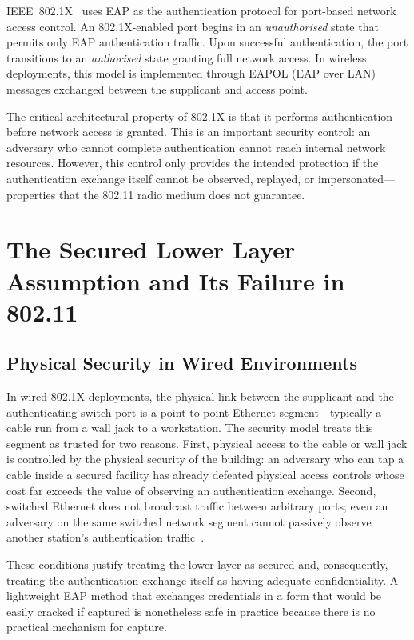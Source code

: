 \documentclass[journal]{IEEEtran}
\begin{document}
IEEE~802.1X~\cite{ieee8021x} uses EAP as the authentication protocol for port-based
network access control. An 802.1X-enabled port begins in an \emph{unauthorised} state
that permits only EAP authentication traffic. Upon successful authentication, the
port transitions to an \emph{authorised} state granting full network access. In
wireless deployments, this model is implemented through EAPOL (EAP over LAN) messages
exchanged between the supplicant and access point.

The critical architectural property of 802.1X is that it performs authentication
before network access is granted. This is an important security control: an adversary
who cannot complete authentication cannot reach internal network resources. However,
this control only provides the intended protection if the authentication exchange
itself cannot be observed, replayed, or impersonated---properties that the 802.11
radio medium does not guarantee.

\section{The Secured Lower Layer Assumption and Its Failure in 802.11}

\subsection{Physical Security in Wired Environments}

In wired 802.1X deployments, the physical link between the supplicant and the
authenticating switch port is a point-to-point Ethernet segment---typically a
cable run from a wall jack to a workstation. The security model treats this segment
as trusted for two reasons. First, physical access to the cable or wall jack is
controlled by the physical security of the building: an adversary who can tap a
cable inside a secured facility has already defeated physical access controls whose
cost far exceeds the value of observing an authentication exchange. Second, switched
Ethernet does not broadcast traffic between arbitrary ports; even an adversary on
the same switched network segment cannot passively observe another station's
authentication traffic~\cite{edney2004}.

These conditions justify treating the lower layer as secured and, consequently,
treating the authentication exchange itself as having adequate confidentiality. A
lightweight EAP method that exchanges credentials in a form that would be easily
cracked if captured is nonetheless safe in practice because there is no practical
mechanism for capture.
\end{document}
